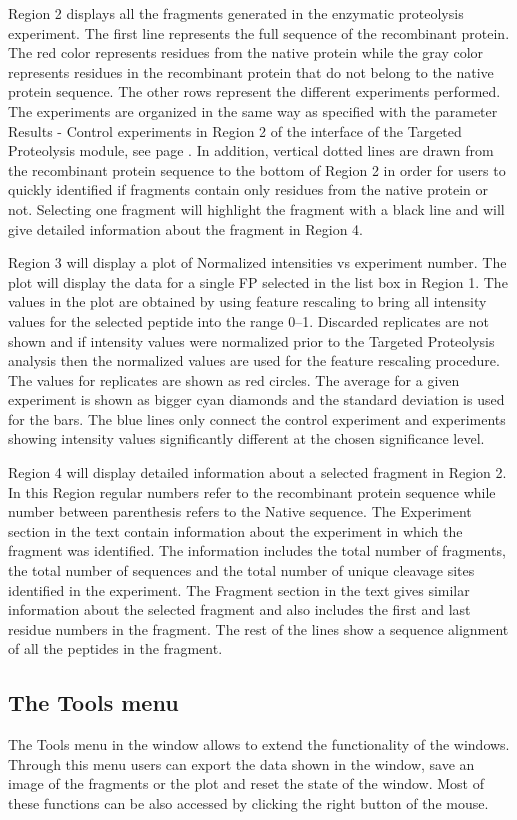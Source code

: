 Region \num{2} displays all the fragments generated in the enzymatic proteolysis experiment. The first line represents the full sequence of the recombinant protein. The red color represents residues from the native protein while the gray color represents residues in the recombinant protein that do not belong to the native protein sequence. The other rows represent the different experiments performed. The experiments are organized in the same way as specified with the parameter Results - Control experiments in Region \num{2} of the interface of the Targeted Proteolysis module, see page \pageref{par:tarprotResultControl}. In addition, vertical dotted lines are drawn from the recombinant protein sequence to the bottom of Region \num{2} in order for users to quickly identified if fragments contain only residues from the native protein or not. Selecting one fragment will highlight the fragment with a black line and will give detailed information about the fragment in Region \num{4}. 

Region \num{3} will display a plot of Normalized intensities vs experiment number. The plot will display the data for a single FP selected in the list box in Region \num{1}. The values in the plot are obtained by using feature rescaling to bring all intensity values for the selected peptide into the range \numrange{0}{1}. Discarded replicates are not shown and if intensity values were normalized prior to the Targeted Proteolysis analysis then the normalized values are used for the feature rescaling procedure. The values for replicates are shown as red circles. The average for a given experiment is shown as bigger cyan diamonds and the standard deviation is used for the bars. The blue lines only connect the control experiment and experiments showing intensity values significantly different at the chosen significance level.  

Region \num{4} will display detailed information about a selected fragment in Region \num{2}. In this Region regular numbers refer to the recombinant protein sequence while number between parenthesis refers to the Native sequence. The Experiment section in the text contain information about the experiment in which the fragment was identified. The information includes the total number of fragments, the total number of sequences and the total number of unique cleavage sites identified in the experiment. The Fragment section in the text gives similar information about the selected fragment and also includes the first and last residue numbers in the fragment. The rest of the lines show a sequence alignment of all the peptides in the fragment.

\subsection{The Tools menu}

The Tools menu in the window allows to extend the functionality of the windows. Through this menu users can export the data shown in the window, save an image of the fragments or the plot and reset the state of the window. Most of these functions can be also accessed by clicking the right button of the mouse.